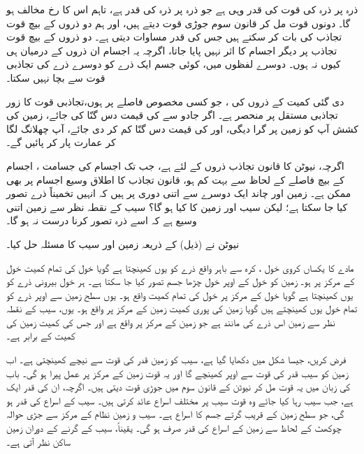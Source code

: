 ذرہ  پر ذرہ  کی قوت کی قدر  وہی ہے  جو ذرہ  پر ذرہ  کی قدر  ہے، تاہم اس کا رخ  مخالف ہو گا۔ دونوں قوت مل کر  قانون سوم  جوڑی    قوت دیتے ہیں، اور ہم  دو ذروں کے بیچ قوت تجاذب  کی بات  کر سکتے ہیں جس کی قدر مساوات  دیتی ہے۔ دو ذروں کے بیچ قوت تجاذب  پر دیگر اجسام  کا اثر نہیں پایا جاتا، اگرچہ یہ اجسام ان ذروں کے  درمیان ہی  کیوں نہ ہوں۔ دوسرے لفظوں میں، کوئی  جسم ایک ذرے کو دوسرے ذرے کی تجاذبی قوت سے   بچا نہیں سکتا۔

دی گئی کمیت کے ذروں کی ، جو کسی مخصوص فاصلے پر ہوں،تجاذبی قوت کا زور  تجاذبی مستقل  پر منحصر ہے۔ اگر جادو  سے  کی قیمت دس گنّا کی جائے، زمین کی کشش آپ کو زمین پر گرا دیگی، اور  کی قیمت دس گنّا کم کر دی جائے، آپ چھلانگ  لگا کر  عمارت  پار کر پائیں گے۔

\quad
اگرچہ، نیوٹن کا قانون تجاذب  ذروں کے لئے ہے،  جب تک اجسام کی جسامت ، اجسام کے بیچ فاصلے کے لحاظ سے بہت کم ہو،  قانون تجاذب  کا اطلاق وسیع اجسام  پر بھی  ممکن ہے۔ زمین اور چاند ایک دوسرے سے  اتنی دوری پر ہیں کہ انہیں تخمیناً ذرے تصور کیا جا سکتا ہے؛ لیکن سیب اور زمین  کا کیا ہو گا؟ سیب کے نقطہ نظر سے زمین اتنی وسیع ہے کہ اسے  ذرہ تصور  کرنا درست نہ ہو گا۔

نیوٹن نے (ذیل)    کے ذریعہ زمین اور سیب کا مسئلہ حل کیا۔

مادے کا یکساں کروی خول ، کرہ سے باہر واقع  ذرے کو یوں کھینچتا ہے گویا  خول  کی تمام کمیت خول کے مرکز پر ہو۔
 زمین کو خول کے اوپر خول چڑھا  جسم تصور کیا جا سکتا ہے۔ ہر خول بیرونی ذرے کو یوں کھینچتا ہے گویا خول کے مرکز پر خول کی تمام کمیت واقع ہو۔ یوں  سطح زمین   سے   اوپر ذرے کو تمام خول یوں کھینچتے ہیں گویا زمین کی پوری کمیت زمین کے مرکز پر واقع ہو۔ یوں، سیب کے نقطہ نظر سے زمین اس  ذرے کی مانند ہے جو زمین کے مرکز پر واقع ہے اور جس کی کمیت زمین کی کمیت کے برابر ہے۔

\quad
فرض کریں، جیسا شکل  میں دکھایا گیا ہے، سیب کو زمین  قدر کی قوت سے نیچے کھینچتی ہے۔ اب  زمین کو سیب   قدر کی  قوت سے اوپر کھینچے گا اور یہ قوت زمین کے مرکز پر عمل پیرا ہو گی۔ باب  کی زبان میں  یہ قوت مل کر نیوٹن کے قانون سوم  میں جوڑی قوت دیتی ہیں۔ اگرچہ، ان کی قدر ایک ہے، جب سیب رہا کیا جائے وہ قوت سیب پر مختلف اسراع عائد کرتی ہیں۔ سیب کے اسراع کی قدر  ہو گی، جو سطح زمین کے قریب گرتے جسم کا  اسراع ہے۔ سیب و زمین نظام  کے مرکز سے جڑی  حوالہ چوکھٹ  کے لحاظ سے زمین کے اسراع کی قدر صرف  ہو گی۔ یقیناً،  سیب کے گرنے کے دوران زمین ساکن نظر آتی ہے۔

